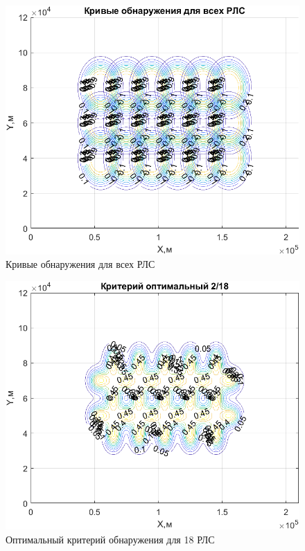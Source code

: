 \begin{figure}
    \centering
    \includegraphics{figures/ALL_RLS.png}
    \caption{Кривые обнаружения для всех РЛС}
    \label{fig:my_label}
\end{figure}

\begin{figure}
    \centering
    \includegraphics{figures/2_18_RLS.png}
    \caption{Оптимальный критерий обнаружения для 18 РЛС}
    \label{fig:my_label}
\end{figure}

